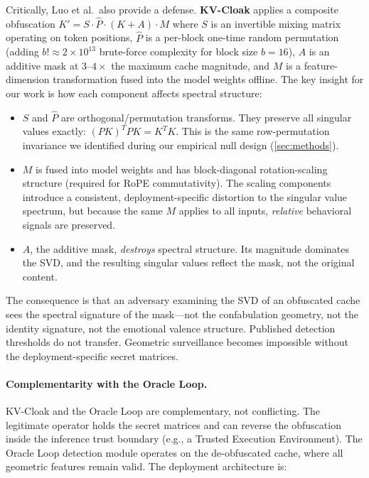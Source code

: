 Critically, Luo et al.\ also provide a defense. \textbf{KV-Cloak} applies a
composite obfuscation $K' = S \cdot \hat{P} \cdot (K + A) \cdot M$ where
$S$ is an invertible mixing matrix operating on token positions, $\hat{P}$
is a per-block one-time random permutation (adding $b! \approx 2 \times 10^{13}$
brute-force complexity for block size $b = 16$), $A$ is an additive mask at
$3$--$4\times$ the maximum cache magnitude, and $M$ is a feature-dimension
transformation fused into the model weights offline. The key insight for our
work is how each component affects spectral structure:

\begin{itemize}[nosep]
  \item $S$ and $\hat{P}$ are orthogonal/permutation transforms. They
    preserve all singular values exactly: $(PK)^T PK = K^T K$. This is the
    same row-permutation invariance we identified during our empirical null
    design (\cref{sec:methods}).
  \item $M$ is fused into model weights and has block-diagonal
    rotation-scaling structure (required for RoPE commutativity). The
    scaling components introduce a consistent, deployment-specific
    distortion to the singular value spectrum, but because the same $M$
    applies to all inputs, \emph{relative} behavioral signals are
    preserved.
  \item $A$, the additive mask, \emph{destroys} spectral structure. Its
    magnitude dominates the SVD, and the resulting singular values reflect
    the mask, not the original content.
\end{itemize}

The consequence is that an adversary examining the SVD of an obfuscated cache
sees the spectral signature of the mask---not the confabulation geometry, not
the identity signature, not the emotional valence structure. Published
detection thresholds do not transfer. Geometric surveillance becomes
impossible without the deployment-specific secret matrices.

\paragraph{Complementarity with the Oracle Loop.}
KV-Cloak and the Oracle Loop are complementary, not conflicting. The
legitimate operator holds the secret matrices and can reverse the
obfuscation inside the inference trust boundary (e.g., a Trusted Execution
Environment). The Oracle Loop detection module operates on the de-obfuscated
cache, where all geometric features remain valid. The deployment architecture
is:

